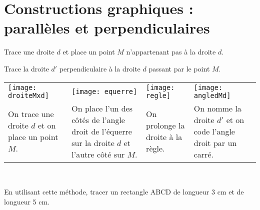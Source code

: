 \section{Constructions graphiques : parallèles et perpendiculaires}

\begin{methode*1}

\begin{exemple*1}
Trace une droite $d$ et place un point $M$ n'appartenant pas à la droite $d$.

Trace la droite $d'$ perpendiculaire à la droite $d$ passant par le point $M$. \\[0.75em]

\begin{tabularx}{\textwidth}{X|X|X|X}
 \texttt{[image: droiteMxd]} &  \texttt{[image: equerre]} & \texttt{[image: regle]} &  \texttt{[image: angledMd]}\\ 
 On trace une droite $d$ et on place un point $M$. & On place l'un des côtés de l'angle droit de l'équerre sur la droite $d$ et l'autre côté sur $M$.
 & On prolonge la droite à la règle. & On nomme la droite $d'$ et on code l'angle droit par un carré.\\

\end{tabularx} \\
 
 \end{exemple*1}


\exercice

En utilisant cette méthode, tracer un rectangle ABCD de longueur 3 cm et de longueur 5 cm.


 
\end{methode*1}

\newpage


